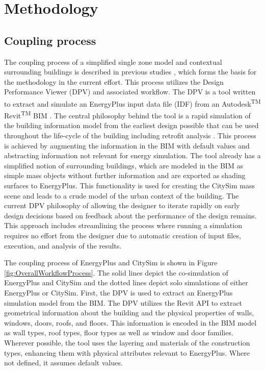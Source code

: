 \documentclass{tBPS2e}
\theoremstyle{plain}
\theoremstyle{definition}
\theoremstyle{remark}
\newcommand{\noteDT}[1]{\footnote{\textcolor{green}{#1}}}
\begin{document}
\section{Methodology}\label{Methodology}

\subsection{Coupling process} 
The coupling process of a simplified single zone
model and contextual surrounding buildings is described in previous studies
\citep{thomas2014multiscale}, which forms the basis for the methodology
in the current effort. This process utilizes the Design Performance Viewer
(DPV) and associated workflow. The DPV is a tool written to extract and
simulate an EnergyPlus input data file (IDF) from an
Autodesk\textsuperscript{TM} Revit\textsuperscript{TM} BIM
\citep{Schlueter2009}. The central philosophy behind the tool is a rapid simulation
of the building information model from the earliest design possible that can be
used throughout the life-cycle of the building including retrofit analysis
\citep{Miller:2014tu}. This process is achieved by augmenting the information
in the BIM with default values and abstracting information not relevant for
energy simulation. The tool already has a simplified notion of surrounding
buildings, which are modeled in the BIM as simple mass objects without further
information and are exported as shading surfaces to EnergyPlus. This
functionality is used for creating the CitySim mass scene and leads to a crude
model of the urban context of the building. The current DPV philosophy of
allowing the designer to iterate rapidly on early design decisions based on
feedback about the performance of the design remains. This approach includes
streamlining the process where running a simulation requires no effort from
the designer due to automatic creation of input files, execution, and analysis
of the results.%

The coupling process of EnergyPlus and CitySim is shown in Figure
\ref{fig:OverallWorkflowProcess}. The solid lines depict the co-simulation of EnergyPlus
and CitySim and the dotted lines depict solo simulations of either EnergyPlus or CitySim. 
First, the DPV is used to extract an
EnergyPlus simulation model from the BIM. The DPV utilizes the Revit API to
extract geometrical information about the building and the physical properties
of walls, windows, doors, roofs, and floors. This information is encoded in the
BIM model as wall types, roof types, floor types as well as window and door
families. Wherever possible, the tool uses the layering and materials of the
construction types, enhancing them with physical attributes relevant to
EnergyPlus. Where not defined, it assumes default values.
\end{document}
